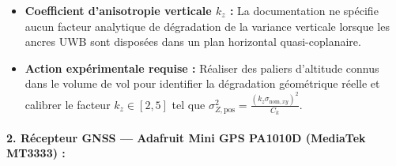 \documentclass[../Formulations_Kalman.tex]{subfiles}
\begin{document}
\begin{itemize}
    \begin{itemize}
        \item \textbf{Coefficient d'anisotropie verticale $k_z$ :} La documentation ne spécifie aucun facteur analytique de dégradation de la variance verticale lorsque les ancres UWB sont disposées dans un plan horizontal quasi-coplanaire.
        \item \textbf{Action expérimentale requise :} Réaliser des paliers d'altitude connus dans le volume de vol pour identifier la dégradation géométrique réelle et calibrer le facteur $k_z \in [2, 5]$ tel que $\sigma_{Z,\text{pos}}^2 = \frac{(k_z \sigma_{\text{nom},xy})^2}{C_k}$.
    \end{itemize}
\end{itemize}

\paragraph{2. Récepteur GNSS — Adafruit Mini GPS PA1010D (MediaTek MT3333) :}
\end{document}
